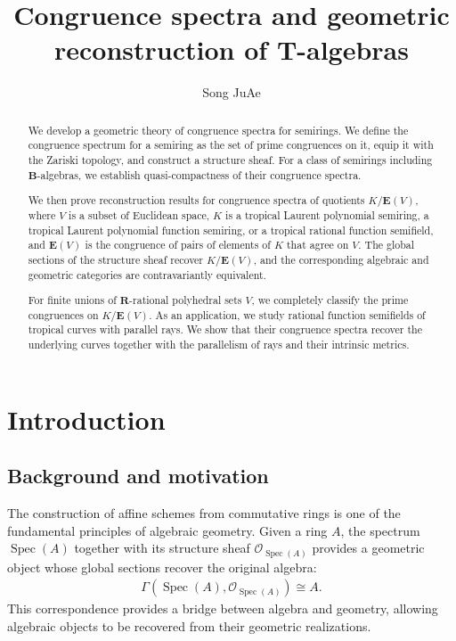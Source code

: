 \documentclass[a4paper,12pt]{amsart}
\title[Congruence spectra and geometric reconstruction of $\boldsymbol{T}$-algebras]{Congruence spectra and geometric reconstruction of $\boldsymbol{T}$-algebras}
\author{Song JuAe}
\theoremstyle{plain}
\theoremstyle{definition}
\begin{document}
\begin{abstract}
We develop a geometric theory of congruence spectra for semirings.
We define the congruence spectrum for a semiring as the set of prime congruences on it, equip it with the Zariski topology, and construct a structure sheaf.
For a class of semirings including $\boldsymbol{B}$-algebras, we establish quasi-compactness of their congruence spectra.

We then prove reconstruction results for congruence spectra of quotients $K/\boldsymbol{E}(V)$, where $V$ is a subset of Euclidean space, $K$ is a tropical Laurent polynomial semiring, a tropical Laurent polynomial function semiring, or a tropical rational function semifield, and $\boldsymbol{E}(V)$ is the congruence of pairs of elements of $K$ that agree on $V$.
The global sections of the structure sheaf recover $K/\boldsymbol{E}(V)$, and the corresponding algebraic and geometric categories are contravariantly equivalent.

For finite unions of $\boldsymbol{R}$-rational polyhedral sets $V$, we completely classify the prime congruences on $K / \boldsymbol{E}(V)$.
As an application, we study rational function semifields of tropical curves with parallel rays.
We show that their congruence spectra recover the underlying curves together with the parallelism of rays and their intrinsic metrics.
\end{abstract}

\maketitle

\section{Introduction}
	\label{section1}

\subsection{Background and motivation}
    \label{subsection1.1}

The construction of affine schemes from commutative rings is one of the fundamental principles of algebraic geometry.
Given a ring $A$, the spectrum $\operatorname{Spec}(A)$ together with its structure sheaf $\mathcal{O}_{\operatorname{Spec}(A)}$ provides a geometric object whose global sections recover the original algebra:
\begin{align*}
\Gamma(\operatorname{Spec}(A),\mathcal{O}_{\operatorname{Spec}(A)}) \cong A.
\end{align*}
This correspondence provides a bridge between algebra and geometry, allowing algebraic objects to be recovered from their geometric realizations.
\end{document}
